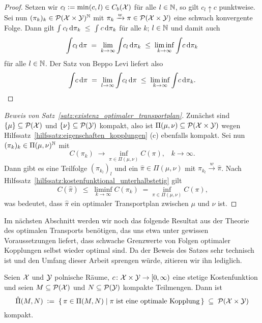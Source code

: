 \documentclass[../thesis/thesis.tex]{subfiles}
\begin{document}
	\begin{proof}
		Setzen wir $c_l \vcentcolon = \min(c, l) \in C_b(\mathcal{X})$ für alle $l \in \mathbb{N}$, so gilt $c_l \uparrow c$ punktweise. Sei nun $(\pi_k)_k \in \mathcal{P}(\mathcal{X} \times \mathcal{Y})^{\mathbb{N}}$ mit $\pi_k \xrightarrow{w} \pi \in \mathcal{P}(\mathcal{X} \times \mathcal{Y})$ eine schwach konvergente Folge. Dann gilt
		$\int_{} \, c_l \, \mathrm{d}\pi_k \; \leq \; \int_{} \, c \, \mathrm{d}\pi_k$ für alle $k$; $l \in \mathbb{N}$ und damit auch 
		\[ \int_{} \, c_l \, \mathrm{d}\pi \; = \; \lim_{k \to \infty} \int_{} \, c_l \, \mathrm{d}\pi_k \; \leq \; \liminf_{k \to \infty} \int_{} \, c \, \mathrm{d}\pi_k \]
		für alle $l \in \mathbb{N}$. Der Satz von Beppo Levi liefert also
		\[ \int_{} \, c \, \mathrm{d}\pi \; = \; \lim_{l \to \infty} \int_{} \, c_l \, \mathrm{d}\pi \; \leq \; \liminf_{k \to \infty} \int_{} \, c \, \mathrm{d}\pi_k \text{.} \qedhere \]
	\end{proof}

	\begin{proof}[Beweis von Satz~\ref{satz:existenz_optimaler_transportplan}]
		Zunächst sind $\left\{\mu\right\} \subseteq \mathcal{P}(\mathcal{X})$ und $\left\{\nu\right\} \subseteq \mathcal{P}(\mathcal{Y})$ kompakt, also ist $\Pi(\mu, \nu) \subseteq \mathcal{P}(\mathcal{X} \times \mathcal{Y})$ 
		wegen Hilfssatz~\ref{hilfssatz:eigenschaften_kopplungen} (c) ebenfalls kompakt.
		Sei nun $(\pi_k)_k \in \Pi(\mu, \nu)^{\mathbb{N}}$ mit
		\[ C(\pi_k) \; \to \inf_{\pi \in \Pi(\mu, \nu)} C(\pi) \text{,} \quad k \to \infty \text{.} \]
		Dann gibt es eine Teilfolge $(\pi_{k_l})_l$ und ein $\hat{\pi} \in \Pi(\mu, \nu)$ mit $\pi_{k_l} \xrightarrow{w} \hat{\pi}$. Nach Hilfssatz~\ref{hilfssatz:kostenfunktional_unterhalbstetig} gilt
		\[ C(\hat{\pi}) \; \leq \; \liminf_{k \to \infty} C(\pi_k) \; = \inf_{\pi \in \Pi(\mu, \nu)} C(\pi) \text{,} \]
		was bedeutet, dass $\hat{\pi}$ ein optimaler Transportplan zwischen $\mu$ und $\nu$ ist. 
	\end{proof}

	Im nächsten Abschnitt werden wir noch das folgende Resultat aus der Theorie des optimalen Transports benötigen, das uns etwa unter gewissen Voraussetzungen liefert, dass schwache Grenzwerte von Folgen optimaler
	Kopplungen selbst wieder optimal sind. Da der Beweis des Satzes sehr technisch ist und den Umfang dieser Arbeit sprengen würde, zitieren wir ihn lediglich.

	\begin{Satz}
		\label{satz:optimale_transportpläne_kompakt}
		Seien $\mathcal{X}$ und $\mathcal{Y}$ polnische Räume, $c \colon \mathcal{X} \times \mathcal{Y} \to [0, \infty)$ eine stetige Kostenfunktion und seien $M \subseteq \mathcal{P}(\mathcal{X})$ und $N \subseteq \mathcal{P}(\mathcal{Y})$ kompakte Teilmengen.
		Dann ist 
		\[ \hat{\Pi}(M, N) \; \vcentcolon = \; \left\{\, \pi \in \Pi(M, N) \; \middle| \; \pi \; \text{ist eine optimale Kopplung} \,\right\} \; \subseteq \; \mathcal{P}(\mathcal{X} \times \mathcal{Y}) \]
		kompakt.
	\end{Satz}
\end{document}

